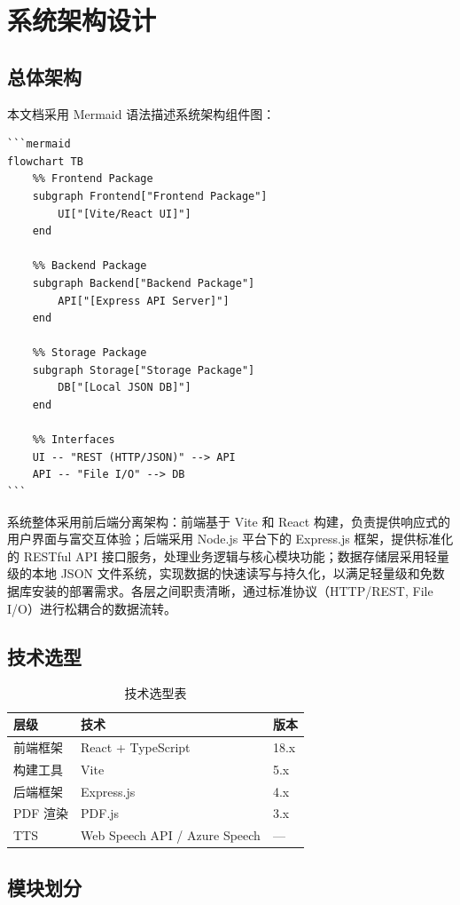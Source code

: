 \chapter{系统架构设计}

\section{总体架构}

本文档采用 Mermaid 语法描述系统架构组件图：

\begin{verbatim}
```mermaid
flowchart TB
    %% Frontend Package
    subgraph Frontend["Frontend Package"]
        UI["[Vite/React UI]"]
    end

    %% Backend Package
    subgraph Backend["Backend Package"]
        API["[Express API Server]"]
    end

    %% Storage Package
    subgraph Storage["Storage Package"]
        DB["[Local JSON DB]"]
    end

    %% Interfaces
    UI -- "REST (HTTP/JSON)" --> API
    API -- "File I/O" --> DB
```
\end{verbatim}

系统整体采用前后端分离架构：前端基于 Vite 和 React 构建，负责提供响应式的用户界面与富交互体验；后端采用 Node.js 平台下的 Express.js 框架，提供标准化的 RESTful API 接口服务，处理业务逻辑与核心模块功能；数据存储层采用轻量级的本地 JSON 文件系统，实现数据的快速读写与持久化，以满足轻量级和免数据库安装的部署需求。各层之间职责清晰，通过标准协议（HTTP/REST, File I/O）进行松耦合的数据流转。

\section{技术选型}

\begin{table}[H]
\centering
\caption{技术选型表}
\begin{tabular}{|l|l|l|}
\hline
\textbf{层级} & \textbf{技术} & \textbf{版本} \\
\hline
前端框架 & React + TypeScript & 18.x \\
\hline
构建工具 & Vite & 5.x \\
\hline
后端框架 & Express.js & 4.x \\
\hline
PDF 渲染 & PDF.js & 3.x \\
\hline
TTS & Web Speech API / Azure Speech & — \\
\hline
\end{tabular}
\end{table}

\section{模块划分}

